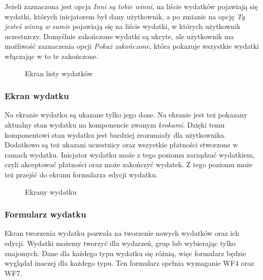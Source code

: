 Jeżeli zaznaczona jest opcja \emph{Inni są tobie winni}, na liście wydatków pojawiają się wydatki, których inicjatorem był dany użytkownik, a po zmianie na opcję \emph{Ty jesteś winny w sumie} pojawiają się na liście wydatki, w których użytkownik uczestniczy. Domyślnie zakończone wydatki są ukryte, ale użytkownik ma możliwość zaznaczenia opcji \emph{Pokaż zakończone}, która pokazuje wszystkie wydatki włączając w to te zakończone.

\begin{figure}[h]%
    \centering
    \caption{Ekran listy wydatków}%
\end{figure}

\clearpage
\subsubsection{Ekran wydatku}
Na ekranie wydatku są ukazane tylko jego dane. Na ekranie jest też pokazany aktualny stan wydatku na komponencie zwanym \emph{krokami}. Dzięki temu komponentowi stan wydatku jest bardziej zrozumiały dla użytkownika. Dodatkowo są też ukazani uczestnicy oraz wszystkie płatności stworzone w ramach wydatku. Inicjator wydatku może z tego poziomu zarządzać wydatkiem, czyli akceptować płatności oraz może zakończyć wydatek. Z tego poziomu może też przejść do ekranu formularza edycji wydatku.

\begin{figure}[h!]%
    \centering
    \qquad
    \qquad
    \qquad
    \caption{Ekrany wydatku}%
\end{figure}

\clearpage
\subsubsection{Formularz wydatku}
Ekran tworzenia wydatku pozwala na tworzenie nowych wydatków oraz ich edycji. Wydatki możemy tworzyć dla wydarzeń, grup lub wybierając tylko znajomych. Dane dla każdego typu wydatku się różnią, więc formularz będzie wyglądał inaczej dla każdego typu. Ten formularz spełnia wymaganie WF4 oraz WF7.


